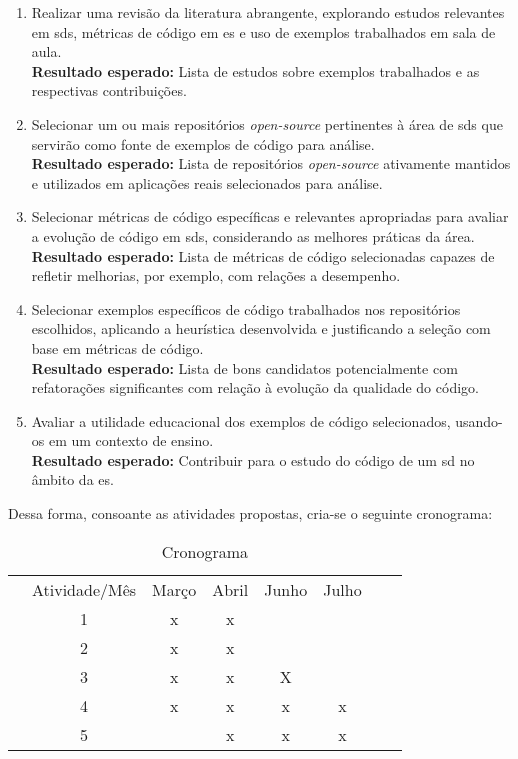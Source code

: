 \begin{enumerate}
    \item Realizar uma revisão da literatura abrangente, explorando estudos relevantes em \gls{sds}, métricas de código em \gls{es} e uso de exemplos trabalhados em sala de aula.
    \\\textbf{Resultado esperado:} Lista de estudos sobre exemplos trabalhados e as respectivas contribuições.

    \item Selecionar um ou mais repositórios \textit{open-source} pertinentes à área de \gls{sds} que servirão como fonte de exemplos de código para análise.
    \\\textbf{Resultado esperado:} Lista de repositórios \textit{open-source} ativamente mantidos e utilizados em aplicações reais selecionados para análise.

    \item Selecionar métricas de código específicas e relevantes apropriadas para avaliar a evolução de código em \gls{sds}, considerando as melhores práticas da área.
    \\\textbf{Resultado esperado:} Lista de métricas de código selecionadas capazes de refletir melhorias, por exemplo, com relações a desempenho.

    \item Selecionar exemplos específicos de código trabalhados nos repositórios escolhidos, aplicando a heurística desenvolvida e justificando a seleção com base em métricas de código.
    \\\textbf{Resultado esperado:} Lista de bons candidatos potencialmente com refatorações significantes com relação à evolução da qualidade do código.

    \item Avaliar a utilidade educacional dos exemplos de código selecionados, usando-os em um contexto de ensino.
    \\\textbf{Resultado esperado:} Contribuir para o estudo do código de um \gls{sd} no âmbito da \gls{es}.
\end{enumerate}

Dessa forma, consoante as atividades propostas, cria-se o seguinte cronograma:

\begin{table}[H]
\centering
\caption{Cronograma}
\begin{tabular}{cccccccc}
\cline{1-1}
\multicolumn{1}{|l|}{} & Atividade/Mês & Março & Abril & Junho & Julho  \\ \cline{1-1}
                       & 1 & x & x &  & \\
                       & 2 & x & x &  & \\
                       & 3 & x & x & X & \\
                       & 4 & x & x & x & x \\
                       & 5 &  & x & x & x
\end{tabular}
\end{table}